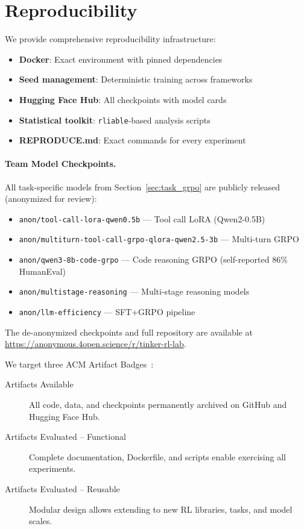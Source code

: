 \documentclass[manuscript,review,anonymous]{acmart}
\begin{document}
\section{Reproducibility}
\label{sec:reproducibility}

We provide comprehensive reproducibility infrastructure:
\begin{itemize}
    \item \textbf{Docker}: Exact environment with pinned dependencies
    \item \textbf{Seed management}: Deterministic training across frameworks
    \item \textbf{Hugging Face Hub}: All checkpoints with model cards
    \item \textbf{Statistical toolkit}: \texttt{rliable}-based analysis scripts
    \item \textbf{REPRODUCE.md}: Exact commands for every experiment
\end{itemize}

\paragraph{Team Model Checkpoints.}
All task-specific models from Section~\ref{sec:task_grpo} are publicly released
(anonymized for review):
\begin{itemize}
    \item \texttt{anon/tool-call-lora-qwen0.5b} --- Tool call LoRA (Qwen2-0.5B)
    \item \texttt{anon/multiturn-tool-call-grpo-qlora-qwen2.5-3b} --- Multi-turn GRPO
    \item \texttt{anon/qwen3-8b-code-grpo} --- Code reasoning GRPO (self-reported 86\% HumanEval)
    \item \texttt{anon/multistage-reasoning} --- Multi-stage reasoning models
    \item \texttt{anon/llm-efficiency} --- SFT+GRPO pipeline
\end{itemize}
The de-anonymized checkpoints and full repository are available at
\url{https://anonymous.4open.science/r/tinker-rl-lab}.

We target three ACM Artifact Badges~\cite{acm2020badges}:
\begin{description}
    \item[Artifacts Available] All code, data, and checkpoints permanently
    archived on GitHub and Hugging Face Hub.
    \item[Artifacts Evaluated -- Functional] Complete documentation,
    Dockerfile, and scripts enable exercising all experiments.
    \item[Artifacts Evaluated -- Reusable] Modular design allows extending
    to new RL libraries, tasks, and model scales.
\end{description}
\end{document}
